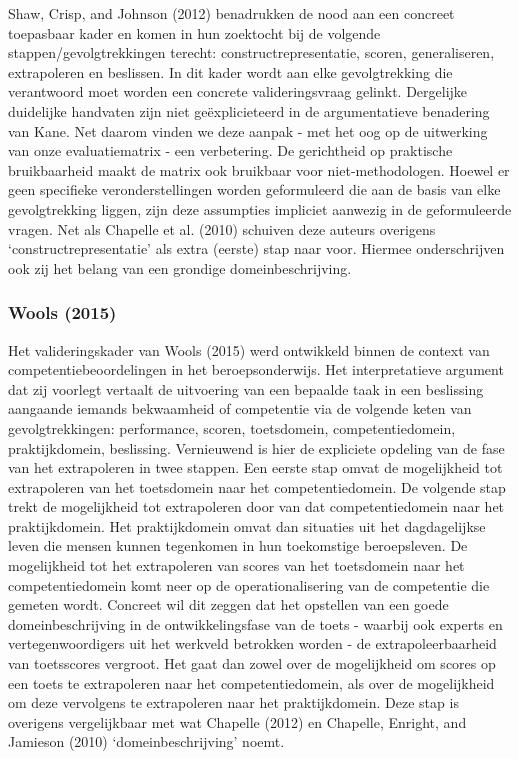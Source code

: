 \documentclass[
  letterpaper,
]{report}
\begin{document}
Shaw, Crisp, and Johnson (2012) benadrukken de nood aan een concreet
toepasbaar kader en komen in hun zoektocht bij de volgende
stappen/gevolgtrekkingen terecht: constructrepresentatie, scoren,
generaliseren, extrapoleren en beslissen. In dit kader wordt aan elke
gevolgtrekking die verantwoord moet worden een concrete valideringsvraag
gelinkt. Dergelijke duidelijke handvaten zijn niet geëxplicieteerd in de
argumentatieve benadering van Kane. Net daarom vinden we deze aanpak -
met het oog op de uitwerking van onze evaluatiematrix - een verbetering.
De gerichtheid op praktische bruikbaarheid maakt de matrix ook bruikbaar
voor niet-methodologen. Hoewel er geen specifieke veronderstellingen
worden geformuleerd die aan de basis van elke gevolgtrekking liggen,
zijn deze assumpties impliciet aanwezig in de geformuleerde vragen. Net
als Chapelle et al. (2010) schuiven deze auteurs overigens
`constructrepresentatie' als extra (eerste) stap naar voor. Hiermee
onderschrijven ook zij het belang van een grondige domeinbeschrijving.

\hypertarget{wools-2015}{%
\subsubsection*{Wools (2015)}\label{wools-2015}}

Het valideringskader van Wools (2015) werd ontwikkeld binnen de context
van competentiebeoordelingen in het beroepsonderwijs. Het
interpretatieve argument dat zij voorlegt vertaalt de uitvoering van een
bepaalde taak in een beslissing aangaande iemands bekwaamheid of
competentie via de volgende keten van gevolgtrekkingen: performance,
scoren, toetsdomein, competentiedomein, praktijkdomein, beslissing.
Vernieuwend is hier de expliciete opdeling van de fase van het
extrapoleren in twee stappen. Een eerste stap omvat de mogelijkheid tot
extrapoleren van het toetsdomein naar het competentiedomein. De volgende
stap trekt de mogelijkheid tot extrapoleren door van dat
competentiedomein naar het praktijkdomein. Het praktijkdomein omvat dan
situaties uit het dagdagelijkse leven die mensen kunnen tegenkomen in
hun toekomstige beroepsleven. De mogelijkheid tot het extrapoleren van
scores van het toetsdomein naar het competentiedomein komt neer op de
operationalisering van de competentie die gemeten wordt. Concreet wil
dit zeggen dat het opstellen van een goede domeinbeschrijving in de
ontwikkelingsfase van de toets - waarbij ook experts en
vertegenwoordigers uit het werkveld betrokken worden - de
extrapoleerbaarheid van toetsscores vergroot. Het gaat dan zowel over de
mogelijkheid om scores op een toets te extrapoleren naar het
competentiedomein, als over de mogelijkheid om deze vervolgens te
extrapoleren naar het praktijkdomein. Deze stap is overigens
vergelijkbaar met wat Chapelle (2012) en Chapelle, Enright, and Jamieson
(2010) `domeinbeschrijving' noemt.
\end{document}
